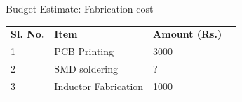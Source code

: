 \documentclass[aspectratio=169]{beamer}
\begin{document}
\begin{frame}{Budget Estimate: Fabrication cost}
\begin{table}[]
	\begin{tabular}{|l|l|l|l}
		\cline{1-3}
		\textbf{Sl. No.} & \textbf{Item}        & \textbf{Amount (Rs.)} &  \\ \cline{1-3}
		1                & PCB Printing         & 3000                    &  \\ \cline{1-3}
		2                & SMD soldering        & ?                     &  \\ \cline{1-3}
		3                & Inductor Fabrication & 1000                  &  \\ \cline{1-3}
	\end{tabular}
\end{table}
\end{frame}
\end{document}
